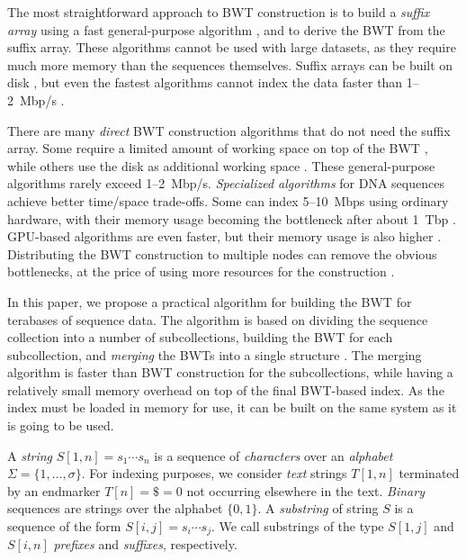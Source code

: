\documentclass[smallabstract,smallcaptions]{dccpaper}
\newcommand{\set}[1]{\ensuremath{\{ #1 \}}}
\newcommand{\BWT}{\textsf{BWT}}
\begin{document}
The most straightforward approach to \BWT{} construction is to build a \emph{suffix array} using a fast general-purpose algorithm \cite{Mori2008,Nong2011}, and to derive the \BWT{} from the suffix array. These algorithms cannot be used with large datasets, as they require much more memory than the sequences themselves. Suffix arrays can be built on disk \cite{Gonnet1992}, but even the fastest algorithms cannot index the data faster than 1\nobreakdash--2~Mbp/s
\cite{Kaerkkaeinen2015a}.

There are many \emph{direct} \BWT{} construction algorithms that do not need the suffix array. Some require a limited amount of working space on top of the \BWT{} \cite{Hon2007,Kaerkkaeinen2007,Siren2009,Okanohara2009}, while others use the disk as additional working space \cite{Ferragina2012,Beller2013}. These general-purpose algorithms rarely exceed 1\nobreakdash--2~Mbp/s. \emph{Specialized algorithms} for DNA sequences achieve better time/space trade-offs. Some can index 5\nobreakdash--10~Mbps using ordinary hardware, with their memory usage becoming the bottleneck after about 1~Tbp \cite{Bauer2013,Li2014a}. GPU-based algorithms are even faster, but their memory usage is also higher \cite{Liu2014,Pantaleoni2014}. Distributing the \BWT{} construction to multiple nodes can remove the obvious bottlenecks, at the price of using more resources for the construction \cite{Wang2015}.

In this paper, we propose a practical algorithm for building the \BWT{} for terabases of sequence data. The algorithm is based on dividing the sequence collection into a number of subcollections, building the \BWT{} for each subcollection, and \emph{merging} the \BWT{}s into a single structure \cite{Siren2009}. The merging algorithm is faster than \BWT{} construction for the subcollections, while having a relatively small memory overhead on top of the final \BWT-based index. As the index must be loaded in memory for use, it can be built on the same system as it is going to be used.



A \emph{string} $S[1,n] = s_{1} \dotsm s_{n}$ is a sequence of \emph{characters} over an \emph{alphabet} $\Sigma = \set{1, \dotsc, \sigma}$. For indexing purposes, we consider \emph{text} strings $T[1,n]$ terminated by an endmarker $T[n] = \$ = 0$ not occurring elsewhere in the text. \emph{Binary} sequences are strings over the alphabet $\set{0, 1}$. A \emph{substring} of string $S$ is a sequence of the form $S[i,j] = s_{i} \dotsm s_{j}$. We call substrings of the type $S[1,j]$ and $S[i,n]$ \emph{prefixes} and \emph{suffixes}, respectively.
\end{document}
